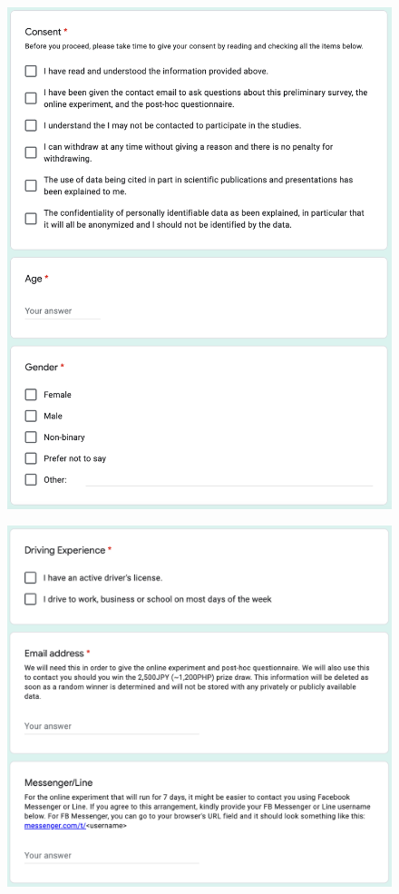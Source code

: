 \begin{figure}[h]
  \centering
  \includegraphics[scale=0.6]{figures/d-info4.png}
\end{figure}

\begin{figure}[h]
  \centering
  \includegraphics[scale=0.6]{figures/d-info5.png}
\end{figure}
\clearpage

